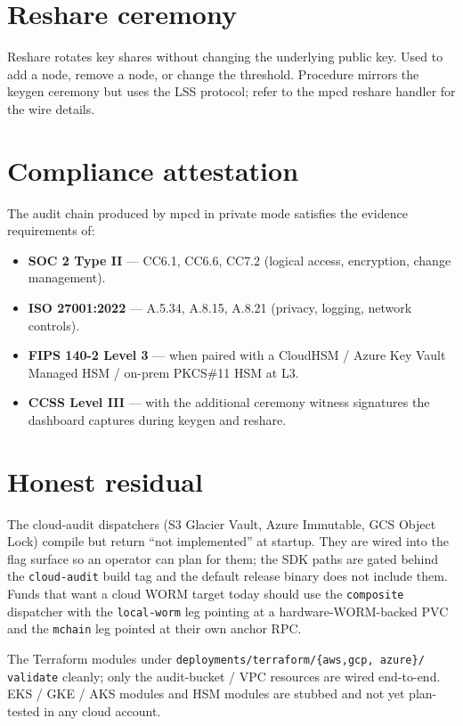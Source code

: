 \documentclass[11pt,a4paper]{article}
\begin{document}
\section{Reshare ceremony}

Reshare rotates key shares without changing the underlying public key.
Used to add a node, remove a node, or change the threshold. Procedure
mirrors the keygen ceremony but uses the LSS protocol; refer to the
mpcd reshare handler for the wire details.

\section{Compliance attestation}

The audit chain produced by mpcd in private mode satisfies the evidence
requirements of:

\begin{itemize}
  \item \textbf{SOC 2 Type II} --- CC6.1, CC6.6, CC7.2 (logical access,
        encryption, change management).
  \item \textbf{ISO 27001:2022} --- A.5.34, A.8.15, A.8.21 (privacy,
        logging, network controls).
  \item \textbf{FIPS 140-2 Level 3} --- when paired with a CloudHSM /
        Azure Key Vault Managed HSM / on-prem PKCS\#11 HSM at L3.
  \item \textbf{CCSS Level III} --- with the additional ceremony witness
        signatures the dashboard captures during keygen and reshare.
\end{itemize}

\section{Honest residual}

The cloud-audit dispatchers (S3 Glacier Vault, Azure Immutable, GCS
Object Lock) compile but return ``not implemented'' at startup. They
are wired into the flag surface so an operator can plan for them; the
SDK paths are gated behind the \texttt{cloud-audit} build tag and the
default release binary does not include them. Funds that want a cloud
WORM target today should use the \texttt{composite} dispatcher with the
\texttt{local-worm} leg pointing at a hardware-WORM-backed PVC and the
\texttt{mchain} leg pointed at their own anchor RPC.

The Terraform modules under \texttt{deployments/terraform/\{aws,gcp,
azure\}/} \texttt{validate} cleanly; only the audit-bucket / VPC
resources are wired end-to-end. EKS / GKE / AKS modules and HSM modules
are stubbed and not yet plan-tested in any cloud account.
\end{document}
